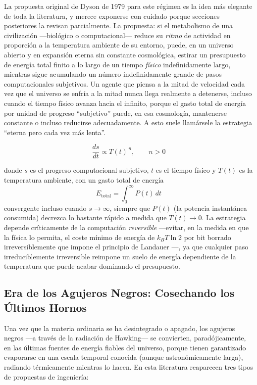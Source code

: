 \documentclass[11pt]{article}
\begin{document}
La propuesta original de Dyson de 1979 para este régimen es la idea más elegante de toda la literatura, y merece exponerse con cuidado porque secciones posteriores la revisan parcialmente. La propuesta: si el metabolismo de una civilización —biológico o computacional— reduce su \emph{ritmo} de actividad en proporción a la temperatura ambiente de su entorno, puede, en un universo abierto y en expansión eterna sin constante cosmológica, estirar un presupuesto de energía total finito a lo largo de un tiempo \emph{físico} indefinidamente largo, mientras sigue acumulando un número indefinidamente grande de pasos computacionales subjetivos. Un agente que piensa a la mitad de velocidad cada vez que el universo se enfría a la mitad nunca llega realmente a detenerse, incluso cuando el tiempo físico avanza hacia el infinito, porque el gasto total de energía por unidad de progreso ``subjetivo'' puede, en esa cosmología, mantenerse constante o incluso reducirse adecuadamente. A esto suele llamársele la estrategia ``eterna pero cada vez más lenta''.

\begin{equation}
\label{eq:dyson-metabolism}
\frac{d s}{d t} \propto T(t)^{\,n}, \qquad n > 0
\end{equation}

\noindent donde $s$ es el progreso computacional subjetivo, $t$ es el tiempo físico y $T(t)$ es la temperatura ambiente, con un gasto total de energía
\begin{equation}
\label{eq:dyson-energy}
E_{\text{total}} = \int_0^{\infty} P(t)\, dt
\end{equation}
convergente incluso cuando $s \to \infty$, siempre que $P(t)$ (la potencia instantánea consumida) decrezca lo bastante rápido a medida que $T(t) \to 0$. La estrategia depende críticamente de la computación \emph{reversible} —evitar, en la medida en que la física lo permita, el coste mínimo de energía de $k_B T \ln 2$ por bit borrado irreversiblemente que impone el principio de Landauer \citep{landauer1961irreversibility}—, ya que cualquier paso irreduciblemente irreversible reimpone un suelo de energía dependiente de la temperatura que puede acabar dominando el presupuesto.

\subsection{Era de los Agujeros Negros: Cosechando los Últimos Hornos}
\label{sec:blackhole}

Una vez que la materia ordinaria se ha desintegrado o apagado, los agujeros negros —a través de la radiación de Hawking— se convierten, paradójicamente, en las últimas fuentes de energía fiables del universo, porque tienen garantizado evaporarse en una escala temporal conocida (aunque astronómicamente larga), radiando térmicamente mientras lo hacen. En esta literatura reaparecen tres tipos de propuestas de ingeniería:
\end{document}
